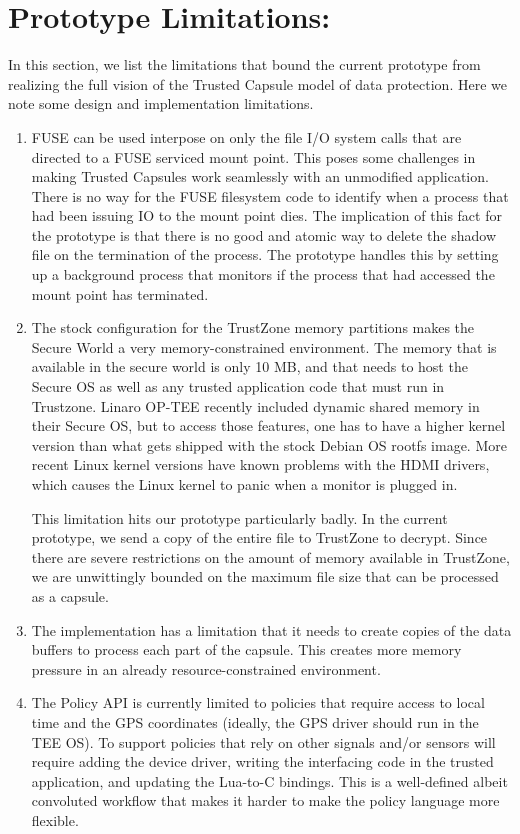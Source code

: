 \section{Prototype Limitations:}
In this section, we list the limitations that bound the current prototype from
realizing the full vision of the Trusted Capsule model of data protection. Here
we note some design and implementation limitations.

\begin{enumerate}
    \item FUSE can be used interpose on only the file I/O system calls that are
directed to a FUSE serviced mount point. This poses some challenges in making
Trusted Capsules work seamlessly with an unmodified application.\\There is no
way for the FUSE filesystem code to identify when a process that had been
issuing IO to the mount point dies. The implication of this fact for the
prototype is that there is no good and atomic way to delete the shadow file on
the termination of the process. The prototype handles this by setting up a
background process that monitors if the process that had accessed the mount point
has terminated.
    \item The stock configuration for the TrustZone memory partitions makes the
Secure World a very memory-constrained environment. The memory that is available
in the secure world is only 10 MB, and that needs to host the Secure OS as well
as any trusted application code that must run in Trustzone. Linaro OP-TEE
recently included dynamic shared memory in their Secure OS, but to access those
features, one has to have a higher kernel version than what gets shipped with
the stock Debian OS rootfs image. More recent Linux kernel versions have known
problems with the HDMI drivers, which causes the Linux kernel to panic when a
monitor is plugged in.

This limitation hits our prototype particularly badly. In the current prototype,
we send a copy of the entire file to TrustZone to decrypt. Since there are
severe restrictions on the amount of memory available in TrustZone, we are
unwittingly bounded on the maximum file size that can be processed as a capsule.
    \item The implementation has a limitation that it needs to create copies of
the data buffers to process each part of the capsule. This creates more memory
pressure in an already resource-constrained environment.

\item The Policy API is currently limited to policies that require access to local time and the GPS coordinates (ideally, the GPS driver should run in the TEE OS). To support policies that rely on other signals and/or sensors will require adding the device driver, writing the interfacing code in the trusted application, and updating the Lua-to-C bindings. This is a well-defined albeit convoluted workflow that makes it harder to make the policy language more flexible.


\end{enumerate}

